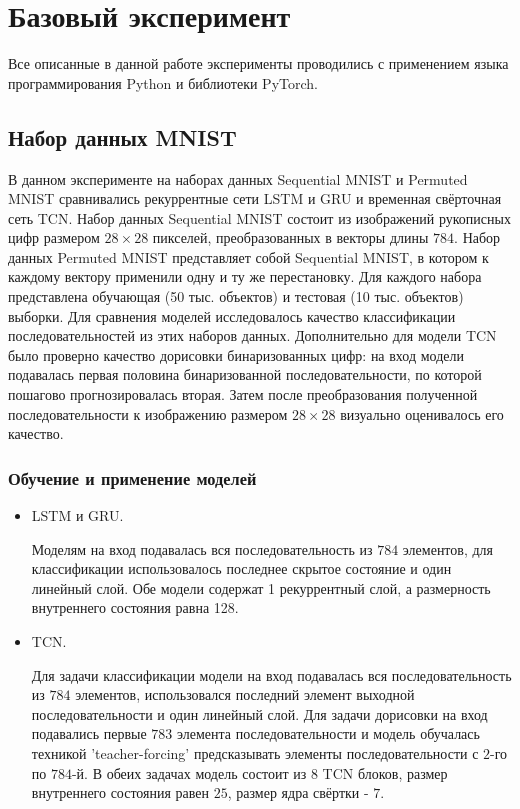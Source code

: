 \documentclass{article}
\begin{document}
\section{Базовый эксперимент}

Все описанные в данной работе эксперименты проводились с применением языка программирования Python и библиотеки PyTorch. 

\subsection{Набор данных MNIST}
В данном эксперименте на наборах данных Sequential MNIST и Permuted MNIST сравнивались рекуррентные сети LSTM и GRU и временная свёрточная сеть TCN. Набор данных Sequential MNIST состоит из изображений рукописных цифр размером $28 \times 28$ пикселей, преобразованных в векторы длины $784$. Набор данных Permuted MNIST представляет собой Sequential MNIST, в котором к каждому вектору применили одну и ту же перестановку. Для каждого набора представлена обучающая (50 тыс. объектов) и тестовая (10 тыс. объектов) выборки.  Для сравнения моделей исследовалось качество классификации последовательностей из этих наборов данных. Дополнительно для модели TCN было проверно качество дорисовки бинаризованных цифр: на вход модели подавалась первая половина бинаризованной последовательности, по которой пошагово прогнозировалась вторая. Затем после преобразования полученной последовательности к изображению размером $28 \times 28$ визуально оценивалось его качество. 

\subsubsection{Обучение и применение моделей}

\begin{itemize}
\item LSTM и GRU.

Моделям на вход подавалась вся последовательность из $784$ элементов, для классификации использовалось последнее скрытое состояние и один линейный слой. Обе модели содержат 1 рекуррентный слой, а размерность внутреннего состояния равна 128. 

\item TCN.

Для задачи классификации модели на вход подавалась вся последовательность из $784$ элементов, использовался последний элемент выходной последовательности и один линейный слой. Для задачи дорисовки на вход подавались первые $783$ элемента последовательности и модель обучалась техникой 'teacher-forcing' предсказывать элементы последовательности с $2$-го по $784$-й. В обеих задачах модель состоит из $8$ TCN блоков, размер внутреннего состояния равен $25$, размер ядра свёртки - $7$.
\end{itemize}
\end{document}
